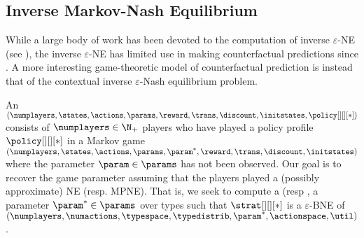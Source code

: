 \subsection{Inverse Markov-Nash Equilibrium}

While a large body of work has been devoted to the computation of inverse $\varepsilon$-NE (see ), the inverse $\varepsilon$-NE has limited use in making counterfactual predictions since .  
A more interesting game-theoretic model of counterfactual prediction is instead that of the contextual inverse $\varepsilon$-Nash equilibrium problem.

An  $(\numplayers, \states, \actions, \params, \reward, \trans, \discount, \initstates, \policy[][][*])$ consists of $\numplayers \in \N_+$ players who have played a policy profile $\policy[][][*]$ in a Markov game $(\numplayers, \states, \actions, \params, \param^*, \reward, \trans, \discount, \initstates)$ where the parameter $\param \in \params$ has not been observed.
Our goal is to recover the game parameter assuming that the players played a (possibly approximate) NE (resp. MPNE). That is, we seek to compute a  (resp , a parameter $\param^* \in \params$ over types such that $\strat[][][*]$ is a $\varepsilon$-BNE of $(\numplayers, \numactions,  \typespace, \typedistrib, \param^*, \actionspace, \util)$
.

